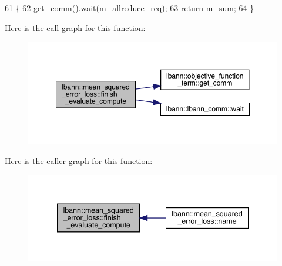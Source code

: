 \begin{DoxyCode}
61                                   \{
62   \hyperlink{classlbann_1_1objective__function__term_a5f89b676a26a6b76ddc26563ac87beb9}{get\_comm}().\hyperlink{classlbann_1_1lbann__comm_a30439f28cf615e1406090799c5499321}{wait}(\hyperlink{classlbann_1_1mean__squared__error__loss_a24fde367aadff7101900bb845dce775e}{m\_allreduce\_req});
63   \textcolor{keywordflow}{return} \hyperlink{classlbann_1_1mean__squared__error__loss_aae743bb204b7f047967ccd867c00721a}{m\_sum};
64 \}
\end{DoxyCode}
Here is the call graph for this function\+:\nopagebreak
\begin{figure}[H]
\begin{center}
\leavevmode
\includegraphics[width=350pt]{classlbann_1_1mean__squared__error__loss_a5486b4e6d6b6fbfdd6fdd381f7cbd7eb_cgraph}
\end{center}
\end{figure}
Here is the caller graph for this function\+:\nopagebreak
\begin{figure}[H]
\begin{center}
\leavevmode
\includegraphics[width=341pt]{classlbann_1_1mean__squared__error__loss_a5486b4e6d6b6fbfdd6fdd381f7cbd7eb_icgraph}
\end{center}
\end{figure}
\mbox{\label{classlbann_1_1mean__squared__error__loss_ab34d59b168205f198b1d4c299365fbbb}} 
